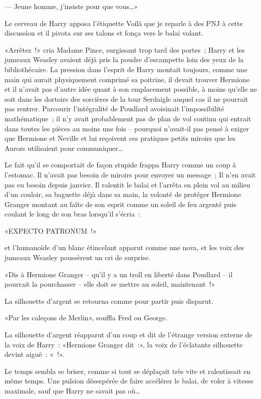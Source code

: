 --- Jeune homme, j'insiste pour que vous…»

Le cerveau de Harry apposa l'étiquette Voilà que je reparle à des PNJ à cette discussion et il pivota sur ses talons et fonça vers le balai volant.

«Arrêtez~!» cria Madame Pince, surgissant trop tard des portes~; Harry et les jumeaux Weasley avaient déjà pris la poudre d'escampette loin des yeux de la bibliothécaire. La pression dans l'esprit de Harry montait toujours, comme une main qui aurait physiquement comprimé sa poitrine, il devait trouver Hermione et il n'avait pas d'autre idée quant à son emplacement possible, à moins qu'elle ne soit dans les dortoirs des sorcières de la tour Serdaigle auquel cas il ne pourrait pas rentrer. Parcourir l'intégralité de Poudlard avoisinait l'impossibilité mathématique~; il n'y avait probablement pas de plan de vol continu qui entrait dans toutes les pièces au moins une fois -- pourquoi n'avait-il pas pensé à exiger que Hermione et Neville et lui reçoivent ces pratiques petits miroirs que les Aurors utilisaient pour communiquer…

Le fait qu'il se comportait de façon stupide frappa Harry comme un coup à l'estomac. Il n'avait pas besoin de miroirs pour envoyer un message~; Il n'en avait pas eu besoin depuis janvier. Il ralentit le balai et l'arrêta en plein vol au milieu d'un couloir, sa baguette déjà dans sa main, la volonté de protéger Hermione Granger montant au faîte de son esprit comme un soleil de feu argenté puis coulant le long de son bras lorsqu'il s'écria~:

«EXPECTO PATRONUM~!»

et l'humanoïde d'un blanc étincelant apparut comme une nova, et les voix des jumeaux Weasley poussèrent un cri de surprise.

«Dis à Hermione Granger -- qu'il y a un troll en liberté dans Poudlard -- il pourrait la pourchasser -- elle doit se mettre au soleil, maintenant~!»

La silhouette d'argent se retourna comme pour partir puis disparut.

«Par les caleçons de Merlin», souffla Fred ou George.

La silhouette d'argent réapparut d'un coup et dit de l'étrange version externe de la voix de Harry~: «Hermione Granger dit~:», la voix de l'éclatante silhouette devint aiguë~: «~!».

Le temps sembla se briser, comme si tout se déplaçait très vite et ralentissait en même temps. Une pulsion désespérée de faire accélérer le balai, de voler à vitesse maximale, sauf que Harry ne savait pas où…

